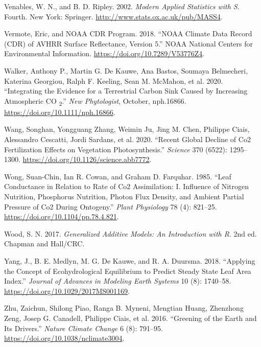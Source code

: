 \documentclass[
]{article}
\newlength{\cslhangindent}
\newlength{\cslentryspacingunit} %
\newenvironment{CSLReferences}[2] %
 {%
  \setlength{\parindent}{0pt}
  \ifodd #1
  \let\oldpar\par
  \def\par{\hangindent=\cslhangindent\oldpar}
  \fi
  \setlength{\parskip}{#2\cslentryspacingunit}
 }%
 {}
\begin{document}
\begin{CSLReferences}{1}{0}
\leavevmode{}%
Venables, W. N., and B. D. Ripley. 2002. \emph{Modern {Applied
Statistics} with {S}}. Fourth. {New York}: {Springer}.
\url{http://www.stats.ox.ac.uk/pub/MASS4}.

\leavevmode{}%
Vermote, Eric, and NOAA CDR Program. 2018. {``{NOAA Climate Data Record}
({CDR}) of {AVHRR Surface Reflectance}, {Version} 5.''} {NOAA National
Centers for Environmental Information}.
\url{https://doi.org/10.7289/V53776Z4}.

\leavevmode{}%
Walker, Anthony P., Martin G. De Kauwe, Ana Bastos, Soumaya Belmecheri,
Katerina Georgiou, Ralph F. Keeling, Sean M. McMahon, et al. 2020.
{``Integrating the Evidence for a Terrestrial Carbon Sink Caused by
Increasing Atmospheric {CO} {\textsubscript{2}}.''} \emph{New
Phytologist}, October, nph.16866.
\url{https://doi.org/10.1111/nph.16866}.

\leavevmode{}%
Wang, Songhan, Yongguang Zhang, Weimin Ju, Jing M. Chen, Philippe Ciais,
Alessandro Cescatti, Jordi Sardans, et al. 2020. {``Recent Global
Decline of {Co2} Fertilization Effects on Vegetation Photosynthesis.''}
\emph{Science} 370 (6522): 1295--1300.
\url{https://doi.org/10.1126/science.abb7772}.

\leavevmode{}%
Wong, Suan-Chin, Ian R. Cowan, and Graham D. Farquhar. 1985. {``Leaf
{Conductance} in {Relation} to {Rate} of {Co2 Assimilation}: {I}.
{Influence} of {Nitrogen Nutrition}, {Phosphorus Nutrition}, {Photon
Flux Density}, and {Ambient Partial Pressure} of {Co2} During
{Ontogeny}.''} \emph{Plant Physiology} 78 (4): 821--25.
\url{https://doi.org/10.1104/pp.78.4.821}.

\leavevmode{}%
Wood, S. N. 2017. \emph{Generalized {Additive Models}: {An Introduction}
with {R}}. 2nd ed. {Chapman and Hall/CRC}.

\leavevmode{}%
Yang, J., B. E. Medlyn, M. G. De Kauwe, and R. A. Duursma. 2018.
{``Applying the {Concept} of {Ecohydrological Equilibrium} to {Predict
Steady State Leaf Area Index}.''} \emph{Journal of Advances in Modeling
Earth Systems} 10 (8): 1740--58.
\url{https://doi.org/10.1029/2017MS001169}.

\leavevmode{}%
Zhu, Zaichun, Shilong Piao, Ranga B. Myneni, Mengtian Huang, Zhenzhong
Zeng, Josep G. Canadell, Philippe Ciais, et al. 2016. {``Greening of the
{Earth} and Its Drivers.''} \emph{Nature Climate Change} 6 (8): 791--95.
\url{https://doi.org/10.1038/nclimate3004}.

\end{CSLReferences}
\end{document}
